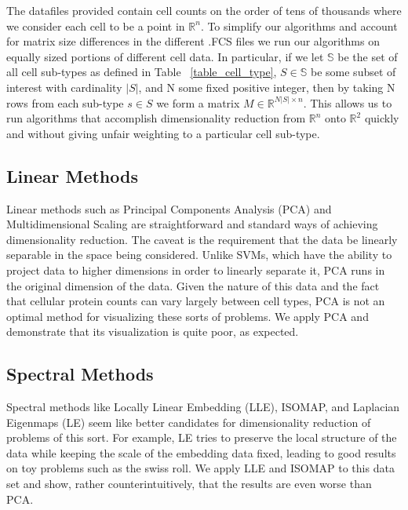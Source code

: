 \documentclass{article}
\begin{document}
The datafiles provided contain cell counts on the order of tens of thousands where we consider each cell to be a point in $\mathbb{R}^n$. To simplify our algorithms and account for matrix size differences in the different .FCS files we run our algorithms on equally sized portions of different cell data. In particular, if we let $\mathbb{S}$ be the set of all cell sub-types as defined in Table ~\ref{table_cell_type}, $S \in \mathbb{S}$  be some subset of interest with cardinality $|S|$, and N some fixed positive integer, then by taking N rows from each sub-type $s \in S$ we form a matrix $M \in \mathbb{R}^{N |S| \times n}$. This allows us to run algorithms that accomplish dimensionality reduction from $\mathbb{R}^n$ onto $\mathbb{R}^2$ quickly and without giving unfair weighting to a particular cell sub-type.


\subsection{Linear Methods}
Linear methods such as Principal Components Analysis (PCA) and Multidimensional Scaling are straightforward and standard ways of achieving dimensionality reduction. The caveat is the requirement that the data be linearly separable in the space being considered. Unlike SVMs, which have the ability to project data to higher dimensions in order to linearly separate it, PCA runs in the original dimension of the data. Given the nature of this data and the fact that cellular protein counts can vary largely between cell types, PCA is not an optimal method for visualizing these sorts of problems. We apply PCA and demonstrate that its visualization is quite poor, as expected.

\subsection{Spectral Methods}
Spectral methods like Locally Linear Embedding (LLE), ISOMAP, and Laplacian Eigenmaps (LE) seem like better candidates for dimensionality reduction of problems of this sort. For example, LE tries to preserve the local structure of the data while keeping the scale of the embedding data fixed, leading to good results on toy problems such as the swiss roll. We apply LLE and ISOMAP to this data set and show, rather counterintuitively, that the results are even worse than PCA.
\end{document}
